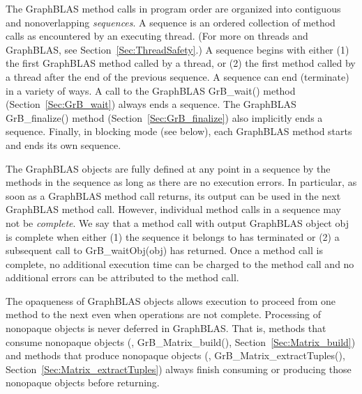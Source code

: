 The GraphBLAS method calls in program order are organized into contiguous
and nonoverlapping \emph{sequences}.  A sequence is an ordered collection
of method calls as encountered by an executing thread. (For more on
threads and GraphBLAS, see Section~\ref{Sec:ThreadSafety}.)  A sequence
begins with either (1) the first GraphBLAS method called by a thread,
or (2) the first method called by a thread after the end of the
previous sequence.  A sequence can end (terminate) in a variety of ways.
A call to the GraphBLAS {\sf GrB\_wait()} method (Section~\ref{Sec:GrB_wait})
always ends a sequence.  The GraphBLAS {\sf GrB\_finalize()} method
(Section~\ref{Sec:GrB_finalize}) also implicitly ends a sequence. Finally,
in blocking mode (see below), each GraphBLAS method starts and ends its
own sequence.

The GraphBLAS objects are fully defined at any point in a sequence by
the methods in the sequence as long as there are no execution errors.
In particular, as soon as a GraphBLAS method call returns, its output can
be used in the next GraphBLAS method call.  However, individual method
calls in a sequence may not be \emph{complete}. We say that a method
call with output GraphBLAS object {\sf obj} is complete when either (1)
the sequence it belongs to has terminated or (2) a subsequent call to
{\sf GrB\_waitObj(obj)} has returned.  Once a method call is complete,
no additional execution time can be charged to the method call and no
additional errors can be attributed to the method call.

The opaqueness of GraphBLAS objects allows execution to proceed
from one method to the next even when operations are not complete.
Processing of nonopaque objects is never deferred in GraphBLAS. That is,
methods that consume nonopaque objects (\eg, {\sf GrB\_Matrix\_build()},
Section~\ref{Sec:Matrix_build}) and methods that produce nonopaque objects (\eg,
{\sf GrB\_Matrix\_extractTuples()}, Section~\ref{Sec:Matrix_extractTuples})
always finish consuming or producing those nonopaque objects before
returning.   


